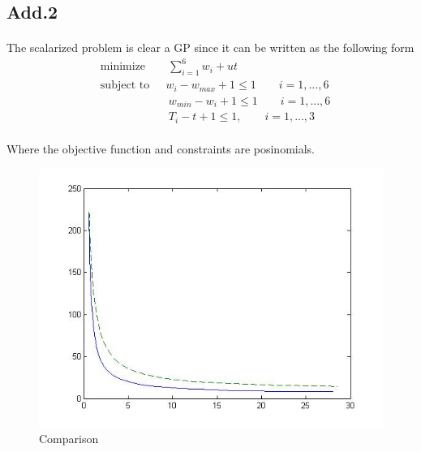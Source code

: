 \subsection*{Add.2}
\paragraph{}
The scalarized problem is clear a GP since it can be written as the following form
\begin{align*}
&\text{minimize} \qquad \sum_{i=1}^6w_i + ut \\
&\text{subject to} \quad \ \  w_i - w_{max} + 1 \leq 1 \qquad i=1,...,6\\
& \qquad \qquad \qquad  w_{min} - w_i + 1 \leq 1 \qquad i=1,...,6\\ 
& \qquad \qquad \qquad  T_i - t + 1 \leq 1, \qquad i=1,...,3
\end{align*}
\paragraph{}
Where the objective function and constraints are posinomials.
\begin{figure}
	\centering
	\includegraphics[scale=0.7]{Compare.jpg}
	\caption{Comparison}
\end{figure}
\paragraph{}


